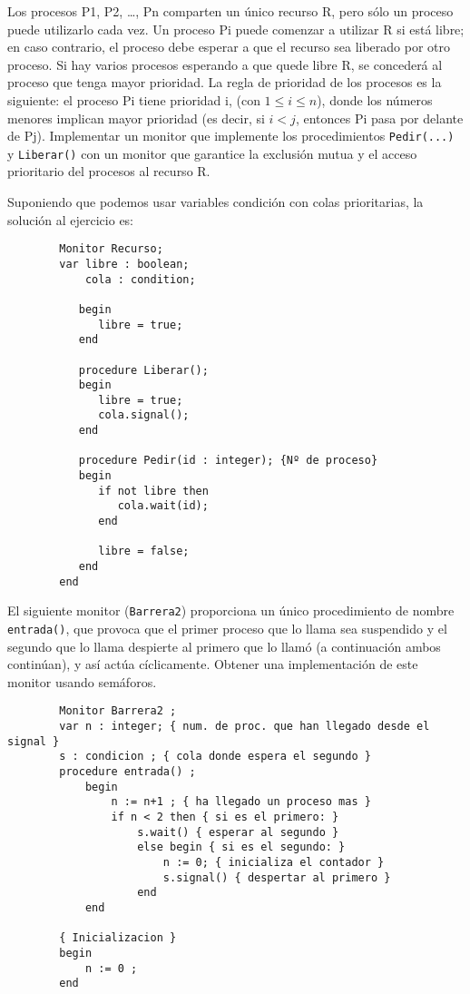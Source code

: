 \begin{ejercicio}
    Los procesos P1, P2, \ldots, Pn comparten un único recurso R, pero sólo un proceso puede utilizarlo cada vez. Un proceso Pi puede comenzar a utilizar R si está libre; en caso contrario, el proceso debe esperar a que el recurso sea liberado por otro proceso. Si hay varios procesos esperando a que quede libre R, se concederá al proceso que tenga mayor prioridad. La regla de prioridad de los procesos es la siguiente: el proceso Pi tiene prioridad i, (con $1 \leq i \leq n$), donde los números menores implican mayor prioridad (es decir, si $i < j$, entonces Pi pasa por delante de Pj). Implementar un monitor que implemente los procedimientos \verb|Pedir(...)| y \verb|Liberar()| con un monitor que garantice la exclusión mutua y el acceso prioritario del procesos al recurso R.

    Suponiendo que podemos usar variables condición con colas prioritarias, la solución al ejercicio es:
    \begin{verbatim}
        Monitor Recurso;
        var libre : boolean;
            cola : condition;

           begin
              libre = true;
           end

           procedure Liberar();
           begin
              libre = true;
              cola.signal();
           end

           procedure Pedir(id : integer); {Nº de proceso}
           begin
              if not libre then
                 cola.wait(id);
              end

              libre = false;
           end
        end
    \end{verbatim}
\end{ejercicio}

\begin{ejercicio}
    El siguiente monitor (\verb|Barrera2|) proporciona un único procedimiento de nombre \verb|entrada()|, que provoca que el primer proceso que lo llama sea suspendido y el segundo que lo llama despierte al primero que lo llamó (a continuación ambos continúan), y así actúa cíclicamente.
    Obtener una implementación de este monitor usando semáforos.
    \begin{verbatim}
        Monitor Barrera2 ;
        var n : integer; { num. de proc. que han llegado desde el signal }
        s : condicion ; { cola donde espera el segundo }
        procedure entrada() ;
            begin
                n := n+1 ; { ha llegado un proceso mas }
                if n < 2 then { si es el primero: }
                    s.wait() { esperar al segundo }
                    else begin { si es el segundo: }
                        n := 0; { inicializa el contador }
                        s.signal() { despertar al primero }
                    end
            end

        { Inicializacion }
        begin
            n := 0 ;
        end
    \end{verbatim}
\end{ejercicio}

